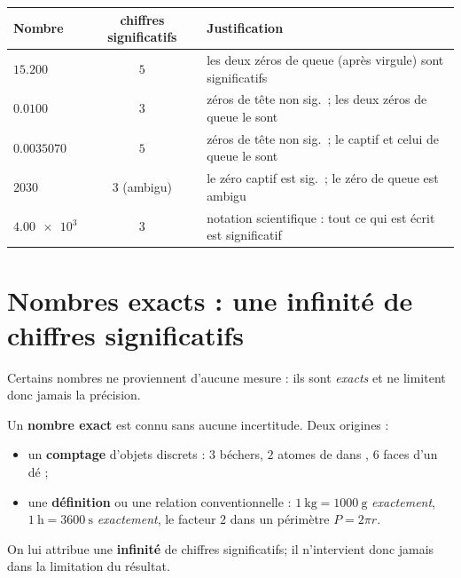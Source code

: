 \documentclass[11pt,a4paper]{article}
\newcommand{\CS}{chiffres significatifs}
\begin{document}
\begin{exemple}
\begin{center}\renewcommand{\arraystretch}{1.35}
\begin{tabular}{>{\centering\arraybackslash}m{2.6cm} c >{\raggedright\arraybackslash}m{7.4cm}}
\toprule
\textbf{Nombre} & \textbf{\CS} & \textbf{Justification}\\
\midrule
$\num{15,200}$    & $5$ & les deux zéros de queue (après virgule) sont significatifs\\
$\num{0,0100}$    & $3$ & zéros de tête non sig.\ ; les deux zéros de queue le sont\\
$\num{0,0035070}$ & $5$ & zéros de tête non sig.\ ; le captif et celui de queue le sont\\
$\num{2030}$      & $3$ (ambigu) & le zéro captif est sig.\ ; le zéro de queue est ambigu\\
$\num{4,00e3}$    & $3$ & notation scientifique : tout ce qui est écrit est significatif\\
\bottomrule
\end{tabular}
\end{center}
\end{exemple}

\section{Nombres exacts : une infinité de chiffres significatifs}
\label{sec:exacts}
Certains nombres ne proviennent d'aucune mesure : ils sont \emph{exacts} et ne limitent donc jamais
la précision.

\begin{definition}
Un \textbf{nombre exact} est connu sans aucune incertitude. Deux origines :
\begin{itemize}[leftmargin=1.6em,topsep=2pt,itemsep=1.5pt]
  \item un \textbf{comptage} d'objets discrets : $3$ béchers, $2$ atomes de  dans ,
        $6$ faces d'un dé ;
  \item une \textbf{définition} ou une relation conventionnelle : $\qty{1}{\kilo\gram}=\qty{1000}{\gram}$
        \emph{exactement}, $\qty{1}{\hour}=\qty{3600}{\second}$ \emph{exactement}, le facteur $2$ dans
        un périmètre $P=2\pi r$.
\end{itemize}
On lui attribue une \textbf{infinité} de \CS ; il n'intervient donc jamais dans la limitation du
résultat.
\end{definition}
\end{document}
